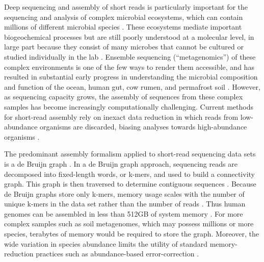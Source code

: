 \documentclass[draft]{pnastwo}
\begin{document}
\begin{article}
Deep sequencing and assembly of short reads is particularly important
for the sequencing and analysis of complex microbial ecosystems, which
can contain millions of different microbial species
\cite{pubmed20195499,pubmed16123304}.  These ecosystems mediate
important biogeochemical processes but are still poorly understood at
a molecular level, in large part because they consist of many microbes
that cannot be cultured or studied individually in the lab
\cite{pubmed20195499,nrcbook}.  Ensemble sequencing (``metagenomics'') of
these complex environments is one of the few ways to render them
accessible, and has resulted in substantial early progress in
understanding the microbial composition and function of the ocean,
human gut, cow rumen, and permafrost soil
\cite{metahit,rumen,sargasso,permafrost}.  However, as sequencing
capacity grows, the assembly of sequences from these complex samples
has become increasingly computationally challenging.  Current methods
for short-read assembly rely on inexact data reduction in which reads
from low-abundance organisms are discarded, biasing analyses towards
high-abundance organisms \cite{metahit,rumen,permafrost}.


The predominant assembly formalism applied to short-read sequencing
data sets is a de Bruijn graph
\cite{pubmed11504945,pubmed20211242,pubmed22068540}.  In a de Bruijn
graph approach, sequencing reads are decomposed into fixed-length
words, or k-mers, and used to build a connectivity graph.  This graph
is then traversed to determine contiguous sequences
\cite{pubmed22068540}.  Because de Bruijn graphs store only k-mers,
memory usage scales with the number of unique k-mers in the data set
rather than the number of reads \cite{succinct,pubmed22068540}.  Thus
human genomes can be assembled in less than 512GB of system memory
\cite{pmid21187386}.  For more complex samples such as soil
metagenomes, which may possess millions or more species, terabytes of
memory would be required to store the graph.  Moreover, the wide
variation in species abundance limits the utility of standard
memory-reduction practices such as abundance-based error-correction
\cite{pubmed21114842}.


\end{article}
\end{document}
